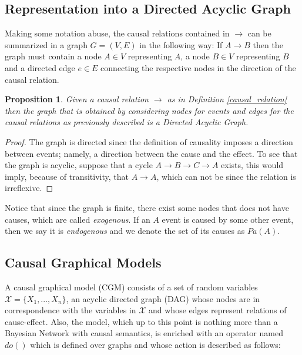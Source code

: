 \documentclass[11pt]{article}
\theoremstyle{plain}
\newtheorem{prop}[teo]{Proposition}
\begin{document}
	\subsection{Representation into a Directed Acyclic Graph}
	Making some notation abuse, the causal relations contained in $\to$ can be summarized in a graph $G=(V,E)$ in the following way: If $A \to B$ then the graph must contain a node $A \in V$ representing $A$, a node  $B \in V$ representing $B$ and a directed edge $e \in E$ connecting the respective nodes in the direction of the causal relation.
	\begin{prop}
	Given a causal relation $\to$ as in Definition \ref{causal_relation} then the graph that is obtained by considering nodes for events and edges for the causal relations as previously described is a Directed Acyclic Graph.
	\end{prop}
	\begin{proof}
	The graph is directed since the definition of causality imposes a direction between events; namely, a direction between the cause and the effect. To see that the graph is acyclic, suppose that a cycle $A \to B \to C \to A$ exists, this would imply, because of transitivity, that $A \to A$, which can not be since the relation is irreflexive.
	\end{proof}
	Notice that since the graph is finite, there exist some nodes that does not have causes, which are called \textit{exogenous}. If an $A$ event is caused by some other event, then we say it is \textit{endogenous} and we denote the set of its causes as $Pa(A)$.
	\subsection{Causal Graphical Models}
	A causal graphical model (CGM) consists of a set of random variables $\mathcal{X}=\{ X_1,...,X_n \}$, an acyclic directed graph (DAG) whose nodes are in correspondence with the variables in $\mathcal{X}$ and whose edges represent relations of cause-effect. Also, the model, which up to this point is nothing more than a Bayesian Network with causal semantics, is enriched with an operator named $do()$ which is defined over graphs and whose action is described as follows:
\end{document}

